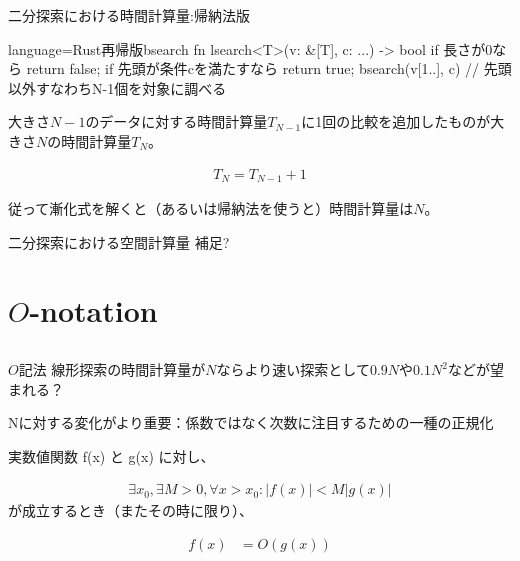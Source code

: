 \documentclass{beamer}
\begin{document}
\begin{frame}[fragile]{二分探索における時間計算量:帰納法版}{}

\begin{codeof}{language=Rust}{再帰版bsearch}
fn lsearch<T>(v: &[T], c: ...) -> bool {
   if 長さが0なら { return false; } 
   if 先頭が条件cを満たすなら { return true; }
   bsearch(v[1..], c) // 先頭以外すなわちN-1個を対象に調べる
}
\end{codeof}

大きさ$N-1$のデータに対する時間計算量$T_{N-1}$に1回の比較を追加したものが大きさ$N$の時間計算量$T_{N}$。

\begin{align*}
T_{N} = T_{N-1} + 1
\end{align*}

従って漸化式を解くと（あるいは帰納法を使うと）時間計算量は$N$。
\end{frame}

\begin{frame}[fragile]{二分探索における空間計算量}{}
補足?
\end{frame}

\section{$O$-notation}		%
\subsection{}

\begin{frame}[fragile]{$O$記法}{}
線形探索の時間計算量が$N$ならより速い探索として$0.9N$や$0.1N^2$などが望まれる？

Nに対する変化がより重要：係数ではなく次数に注目するための一種の正規化

\vfill
実数値関数 f(x) と g(x) に対し、

\begin{align*}
\exists x_{0}, \exists M > 0,  \forall x > x_{0} : |f(x)| < M | g(x) |
\end{align*}
が成立するとき（またその時に限り）、

\begin{align*}
f(x) &= O(g(x))
\end{align*}
\end{frame}
\end{document}
